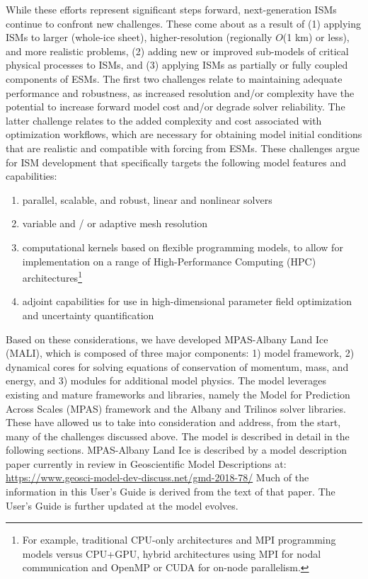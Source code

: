While these efforts represent significant steps forward, next-generation ISMs continue to confront new challenges. These come about as a result of (1) applying ISMs to larger (whole-ice sheet), higher-resolution (regionally $O$(1 km) or less), and more realistic problems, (2) adding new or improved sub-models of critical physical processes to ISMs, and (3) applying ISMs as partially or fully coupled components of ESMs. The first two challenges relate to maintaining adequate performance and robustness, as increased resolution and/or complexity have the potential to increase forward model cost and/or degrade solver reliability. The latter challenge relates to the added complexity and cost associated with optimization workflows, which are necessary for obtaining model initial conditions that are realistic and compatible with forcing from ESMs. %
These challenges argue for ISM development that specifically targets the following model features and capabilities: 
\begin{enumerate}

\item parallel, scalable, and robust, linear and nonlinear solvers

\item variable and / or adaptive mesh resolution 

\item computational kernels based on flexible programming models, to allow for implementation on a range of High-Performance Computing (HPC) architectures\footnote{For example, traditional CPU-only architectures and MPI programming models versus CPU+GPU, hybrid architectures using MPI for nodal communication and OpenMP or CUDA for on-node parallelism.}

\item adjoint capabilities for use in high-dimensional parameter field optimization and uncertainty quantification 

\end{enumerate}

Based on these considerations, we have developed MPAS-Albany Land Ice (MALI), which is composed of three major components: 
1) model framework, 2) dynamical cores for solving equations of conservation of momentum, mass, and energy, and 3) modules for additional model physics. The model leverages existing and mature frameworks and libraries, namely the Model for Prediction Across Scales (MPAS) framework and the Albany and Trilinos solver libraries. These have allowed us to take into consideration and address, from the start, many of the challenges discussed above.
The model is described in detail in the following sections.  
MPAS-Albany Land Ice is described by a model description paper currently in review in Geoscientific Model Descriptions at:
\url{https://www.geosci-model-dev-discuss.net/gmd-2018-78/}
Much of the information in this User's Guide is derived from the text of that paper.
The User's Guide is further updated at the model evolves.


